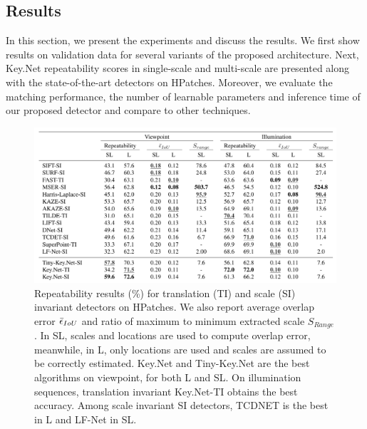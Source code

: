 \subsection{Results}
In this section, we present the experiments and discuss the results. We first show results on validation data for several variants of the proposed architecture. Next, Key.Net repeatability scores in single-scale and multi-scale are presented along with the state-of-the-art detectors on HPatches. Moreover, we evaluate the matching performance, the number of learnable parameters and inference time of our proposed detector and compare to other techniques.

\begin{figure}[!tbh]
 \hspace*{-0.1cm} 
 \vspace{-0.4cm}
    \centering
    \includegraphics[scale=0.23]{main/chapter02/figures/keynet_repeatability_results.png}
    \vspace{-0.0cm}
    \caption{Repeatability results (\%) for translation (TI) and scale (SI) invariant detectors on HPatches. We also report average overlap error $\Bar{\epsilon}_{IoU}$ and ratio of maximum to minimum extracted scale $S_{Range}$. In SL, scales and locations are used to compute overlap error, meanwhile, in L, only locations are used and scales are assumed to be correctly estimated. Key.Net and Tiny-Key.Net are the best algorithms on viewpoint, for both L and SL. On illumination sequences, translation invariant Key.Net-TI obtains the best accuracy. Among scale invariant SI detectors, TCDNET is the best in L and LF-Net in SL.}
    \label{fig:repeatability_scores}
\end{figure}   


